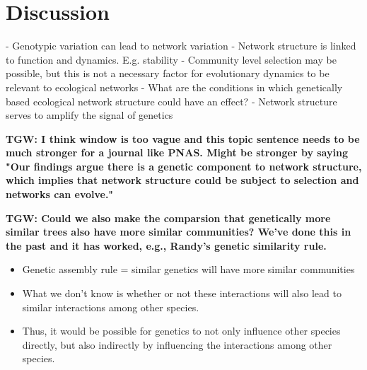 \documentclass[9pt,twocolumn,twoside,lineno]{pnas-new}
\begin{document}
\section*{Discussion}


- Genotypic variation can lead to network variation
- Network structure is linked to function and dynamics. E.g. stability
- Community level selection may be possible, but this is not a
necessary factor for evolutionary dynamics to be relevant to ecological networks
- What are the conditions in which genetically based ecological network structure could have an effect?
- Network structure serves to amplify the signal of genetics


\textbf{TGW: I think window is too vague and this topic sentence needs
  to be much stronger for a journal like PNAS.  Might be stronger by
  saying "Our findings argue there is a genetic component to network
  structure, which implies that network structure could be subject to
  selection and networks can evolve."}

\textbf{TGW: Could we also make the comparsion that genetically more
  similar trees also have more similar communities?  We've done this
  in the past and it has worked, e.g., Randy's genetic similarity
  rule.}

\begin{itemize}
\item Genetic assembly rule = similar genetics will have more similar
  communities
\item What we don't know is whether or not these interactions will
  also lead to similar interactions among other species.
\item Thus, it would be possible for genetics to not only influence
  other species directly, but also indirectly by influencing the
  interactions among other species.
\end{itemize}
\end{document}

